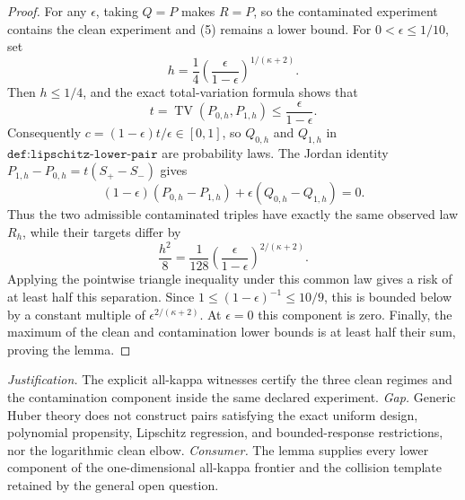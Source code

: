 \documentclass{article}
\begin{document}
\begin{proof}
For any \(\epsilon\), taking \(Q=P\) makes \(R=P\), so the contaminated experiment contains the clean experiment and (5) remains a lower bound. For \(0<\epsilon\leq1/10\), set
\[
h=\frac14\left(\frac{\epsilon}{1-\epsilon}\right)^{1/(\kappa+2)}.
\]
Then \(h\leq1/4\), and the exact total-variation formula shows that
\[
t=\operatorname{TV}(P_{0,h},P_{1,h})
\leq\frac{\epsilon}{1-\epsilon}.
\]
Consequently \(c=(1-\epsilon)t/\epsilon\in[0,1]\), so \(Q_{0,h}\) and \(Q_{1,h}\) in \(\texttt{def:lipschitz-lower-pair}\) are probability laws. The Jordan identity \(P_{1,h}-P_{0,h}=t(S_+-S_-)\) gives
\[
(1-\epsilon)(P_{0,h}-P_{1,h})
+\epsilon(Q_{0,h}-Q_{1,h})=0.
\]
Thus the two admissible contaminated triples have exactly the same observed law \(R_h\), while their targets differ by
\[
\frac{h^2}{8}=\frac1{128}
\left(\frac{\epsilon}{1-\epsilon}\right)^{2/(\kappa+2)}.
\]
Applying the pointwise triangle inequality under this common law gives a risk of at least half this separation. Since \(1\leq(1-\epsilon)^{-1}\leq10/9\), this is bounded below by a constant multiple of \(\epsilon^{2/(\kappa+2)}\). At \(\epsilon=0\) this component is zero. Finally, the maximum of the clean and contamination lower bounds is at least half their sum, proving the lemma.
\end{proof}
\par\smallskip\noindent \textit{Justification.} The explicit all-kappa witnesses certify the three clean regimes and the contamination component inside the same declared experiment. \textit{Gap.} Generic Huber theory does not construct pairs satisfying the exact uniform design, polynomial propensity, Lipschitz regression, and bounded-response restrictions, nor the logarithmic clean elbow. \textit{Consumer.} The lemma supplies every lower component of the one-dimensional all-kappa frontier and the collision template retained by the general open question.
\end{document}
